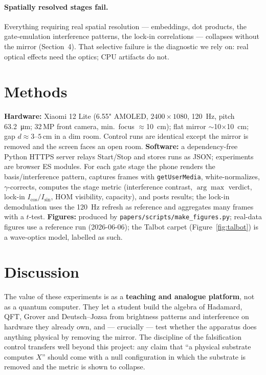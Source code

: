 \documentclass[11pt]{article}
\begin{document}
\paragraph{Spatially resolved stages fail.} Everything requiring real spatial resolution ---
embeddings, dot products, the gate-emulation interference patterns, the lock-in correlations ---
collapses without the mirror (Section~4). That selective failure is the diagnostic we rely on:
real optical effects need the optics; CPU artifacts do not.

\section{Methods}
\textbf{Hardware:} Xiaomi 12 Lite (6.55" AMOLED, $2400\times1080$, \SI{120}{\hertz}, pitch
\SI{63.2}{\micro\meter}; 32\,MP front camera, min.\ focus $\approx$\SI{10}{\centi\meter}); flat
mirror $\sim$\SI{10}{}$\times$\SI{10}{\centi\meter}; gap $d\approx 3\text{--}5$\,cm in a dim
room. Control runs are identical except the mirror is removed and the screen faces an open room.
\textbf{Software:} a dependency-free Python HTTPS server relays Start/Stop and stores runs as
JSON; experiments are browser ES modules. For each gate stage the phone renders the
basis/interference pattern, captures frames with \texttt{getUserMedia}, white-normalizes,
$\gamma$-corrects, computes the stage metric (interference contrast, $\arg\max$ verdict, lock-in
$I_{\cos}/I_{\sin}$, HOM visibility, capacity), and posts results; the lock-in demodulation uses
the \SI{120}{\hertz} refresh as reference and aggregates many frames with a $t$-test.
\textbf{Figures:} produced by \texttt{papers/scripts/make\_figures.py}; real-data figures use a
reference run (2026-06-06); the Talbot carpet (Figure~\ref{fig:talbot}) is a wave-optics model,
labelled as such.

\section{Discussion}
The value of these experiments is as a \textbf{teaching and analogue platform}, not as a quantum
computer. They let a student build the algebra of Hadamard, QFT, Grover and Deutsch--Jozsa from
brightness patterns and interference on hardware they already own, and --- crucially --- test
whether the apparatus does anything physical by removing the mirror. The discipline of the
falsification control transfers well beyond this project: any claim that ``a physical substrate
computes $X$'' should come with a null configuration in which the substrate is removed and the
metric is shown to collapse.
\end{document}
